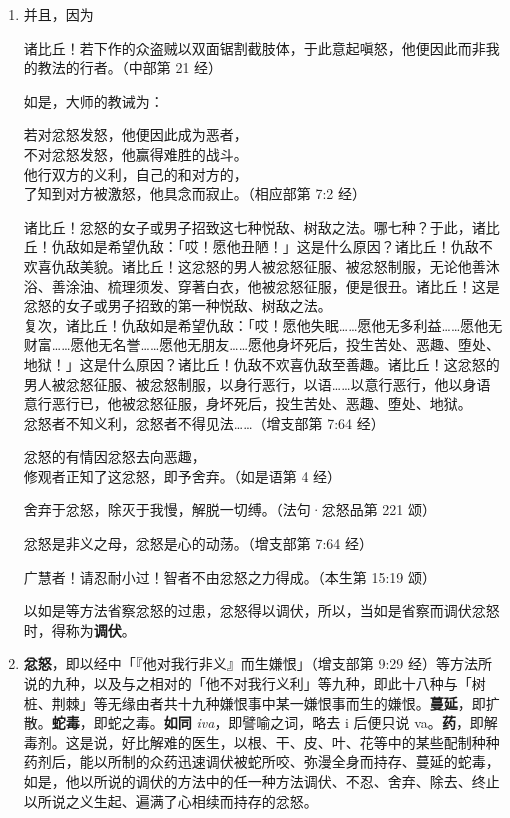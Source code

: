 \begin{enumerate}
\item 并且，因为\begin{quoting}诸比丘！若下作的众盗贼以双面锯割截肢体，于此意起嗔怒，他便因此而非我的教法的行者。（中部第 21 经）\end{quoting}如是，大师的教诫为：\begin{quoting}若对忿怒发怒，他便因此成为恶者，\\不对忿怒发怒，他赢得难胜的战斗。\\他行双方的义利，自己的和对方的，\\了知到对方被激怒，他具念而寂止。（相应部第 7:2 经）\end{quoting}\begin{quoting}诸比丘！忿怒的女子或男子招致这七种悦敌、树敌之法。哪七种？于此，诸比丘！仇敌如是希望仇敌：「哎！愿他丑陋！」这是什么原因？诸比丘！仇敌不欢喜仇敌美貌。诸比丘！这忿怒的男人被忿怒征服、被忿怒制服，无论他善沐浴、善涂油、梳理须发、穿著白衣，他被忿怒征服，便是很丑。诸比丘！这是忿怒的女子或男子招致的第一种悦敌、树敌之法。\\复次，诸比丘！仇敌如是希望仇敌：「哎！愿他失眠……愿他无多利益……愿他无财富……愿他无名誉……愿他无朋友……愿他身坏死后，投生苦处、恶趣、堕处、地狱！」这是什么原因？诸比丘！仇敌不欢喜仇敌至善趣。诸比丘！这忿怒的男人被忿怒征服、被忿怒制服，以身行恶行，以语……以意行恶行，他以身语意行恶行已，他被忿怒征服，身坏死后，投生苦处、恶趣、堕处、地狱。\\忿怒者不知义利，忿怒者不得见法……（增支部第 7:64 经）\end{quoting}\begin{quoting}忿怒的有情因忿怒去向恶趣，\\修观者正知了这忿怒，即予舍弃。（如是语第 4 经）\end{quoting}\begin{quoting}舍弃于忿怒，除灭于我慢，解脱一切缚。（法句·忿怒品第 221 颂）\end{quoting}\begin{quoting}忿怒是非义之母，忿怒是心的动荡。（增支部第 7:64 经）\end{quoting}\begin{quoting}广慧者！请忍耐小过！智者不由忿怒之力得成。（本生第 15:19 颂）\end{quoting}以如是等方法省察忿怒的过患，忿怒得以调伏，所以，当如是省察而调伏忿怒时，得称为\textbf{调伏}。
\item \textbf{忿怒}，即以经中「『他对我行非义』而生嫌恨」（增支部第 9:29 经）等方法所说的九种，以及与之相对的「他不对我行义利」等九种，即此十八种与「树桩、荆棘」等无缘由者共十九种嫌恨事中某一嫌恨事而生的嫌恨。\textbf{蔓延}，即扩散。\textbf{蛇毒}，即蛇之毒。\textbf{如同} \textit{iva}，即譬喻之词，略去 i 后便只说 va。\textbf{药}，即解毒剂。这是说，好比解难的医生，以根、干、皮、叶、花等中的某些配制种种药剂后，能以所制的众药迅速调伏被蛇所咬、弥漫全身而持存、蔓延的蛇毒，如是，他以所说的调伏的方法中的任一种方法调伏、不忍、舍弃、除去、终止以所说之义生起、遍满了心相续而持存的忿怒。

\end{enumerate}

